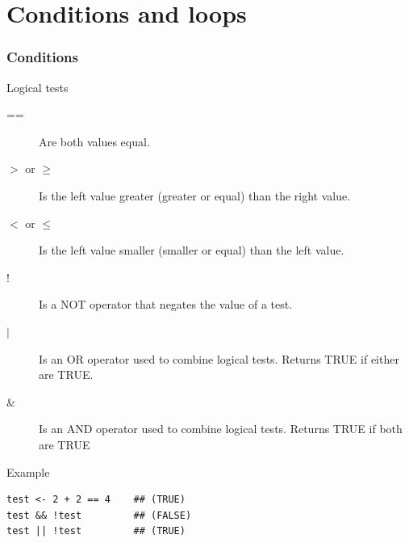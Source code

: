 \documentclass[10pt]{beamer}
\newenvironment{xframe}[2][]
  {\begin{frame}[fragile,environment=xframe,#1]
  \frametitle{#2}}
  {\end{frame}}
\begin{document}


\section{Conditions and loops}
\begin{xframe}{Conditions}
  \begin{block}{Logical tests}
	
    \begin{description}
    \item[{\sf ==}] Are both values equal.
    \item[{\sf $>$ or $\geq$}] Is the left value greater (greater or equal)
    than the right value.
	\item[{\sf $<$ or $\leq$}] Is the left value smaller (smaller or equal) than
	the left value.
    \item[!] Is a NOT operator that negates the value of a test.
    \item[$|$] Is an OR operator used to combine logical tests. Returns TRUE if
    either are TRUE.
    \item[\&] Is an AND operator used to combine logical tests. Returns TRUE
    if both are TRUE
    \end{description}
  \end{block}
  \begin{exampleblock}{Example}
\begin{verbatim}
test <- 2 + 2 == 4    ## (TRUE)
test && !test         ## (FALSE)
test || !test         ## (TRUE)
\end{verbatim}  
  \end{exampleblock}
\end{xframe}

\end{document}
